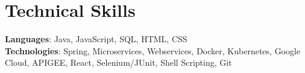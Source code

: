 \section{Technical Skills}
    \begin{itemize}[leftmargin=0.15in, label={}]
	\small{\item{
		\textbf{Languages}{: Java, JavaScript, SQL, HTML, CSS} \\
		\textbf{Technologies}{: Spring, Microservices, Webservices, Docker, Kubernetes, Google Cloud, APIGEE, React, Selenium/JUnit, Shell Scripting, Git}
	}}
    \end{itemize}